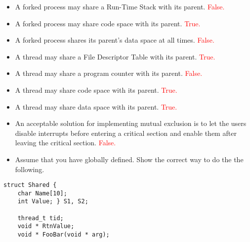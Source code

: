 \documentclass[10pt,landscape]{article}
\newcommand{\answer}[1]{\textcolor{red}{#1}}
\begin{document}
\raggedright
\footnotesize
\begin{multicols}{4}


\setlength{\premulticols}{1pt}
\setlength{\postmulticols}{1pt}
\setlength{\multicolsep}{1pt}
\setlength{\columnsep}{2pt}
\tiny

\begin{itemize}
    \item A forked process may share a Run-Time Stack with its parent. \answer{False.}
    \item A forked process may share code space with its parent. \answer{True.}
    \item A forked process shares its parent's data space at all times. \answer{False.}
    \item A thread may share a File Descriptor Table with its parent. \answer{True.}
    \item A thread may share a program counter with its parent. \answer{False.}
    \item A thread may share code space with its parent. \answer{True.}
    \item A thread may share data space with its parent. \answer{True.}
    \item An acceptable solution for implementing mutual exclusion is to let the users disable interrupts before entering a critical section and enable them after leaving the critical section. \answer{False.}
    \item Assume that you have globally defined. Show the correct way to do the the following.
\end{itemize}
\begin{lstlisting}[style=cC++]
    struct Shared {
    char Name[10];
    int Value; } S1, S2;

    thread_t tid;
    void * RtnValue;
    void * FooBar(void * arg);
\end{lstlisting}


\end{multicols}
\end{document}
